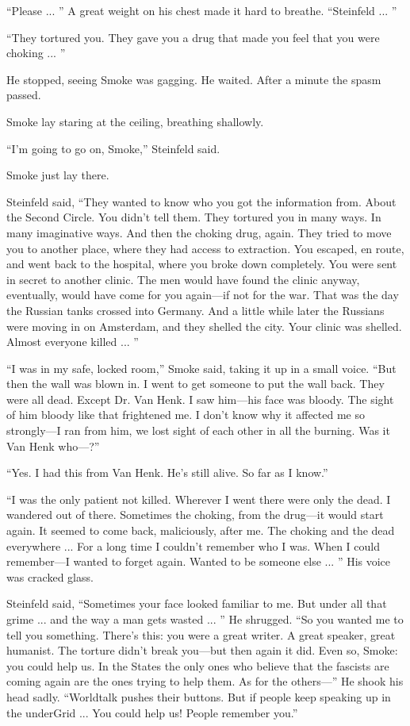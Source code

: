 ``Please ... '' A great weight on his chest made it hard to breathe. ``Steinfeld ... ''

``They tortured you. They gave you a drug that made you feel that you were choking ... ''

He stopped, seeing Smoke was gagging. He waited. After a minute the spasm passed.

Smoke lay staring at the ceiling, breathing shallowly.

``I'm going to go on, Smoke,'' Steinfeld said.

Smoke just lay there.

Steinfeld said, ``They wanted to know who you got the information from. About the Second Circle. You didn't tell them. They tortured you in many ways. In many imaginative ways. And then the choking drug, again. They tried to move you to another place, where they had access to extraction. You escaped, en route, and went back to the hospital, where you broke down completely. You were sent in secret to another clinic. The men would have found the clinic anyway, eventually, would have come for you again---if not for the war. That was the day the Russian tanks crossed into Germany. And a little while later the Russians were moving in on Amsterdam, and they shelled the city. Your clinic was shelled. Almost everyone killed ... ''

``I was in my safe, locked room,'' Smoke said, taking it up in a small voice. ``But then the wall was blown in. I went to get someone to put the wall back. They were all dead. Except Dr. Van Henk. I saw him---his face was bloody. The sight of him bloody like that frightened me. I don't know why it affected me so strongly---I ran from him, we lost sight of each other in all the burning. Was it Van Henk who---?''

``Yes. I had this from Van Henk. He's still alive. So far as I know.''

``I was the only patient not killed. Wherever I went there were only the dead. I wandered out of there. Sometimes the choking, from the drug---it would start again. It seemed to come back, maliciously, after me. The choking and the dead everywhere ... For a long time I couldn't remember who I was. When I could remember---I wanted to forget again. Wanted to be someone else ... '' His voice was cracked glass.

Steinfeld said, ``Sometimes your face looked familiar to me. But under all that grime ... and the way a man gets wasted ... '' He shrugged. ``So you wanted me to tell you something. There's this: you were a great writer. A great speaker, great humanist. The torture didn't break you---but then again it did. Even so, Smoke: you could help us. In the States the only ones who believe that the fascists are coming again are the ones trying to help them. As for the others---'' He shook his head sadly. ``Worldtalk pushes their buttons. But if people keep speaking up in the underGrid ... You could help us! People remember you.''

